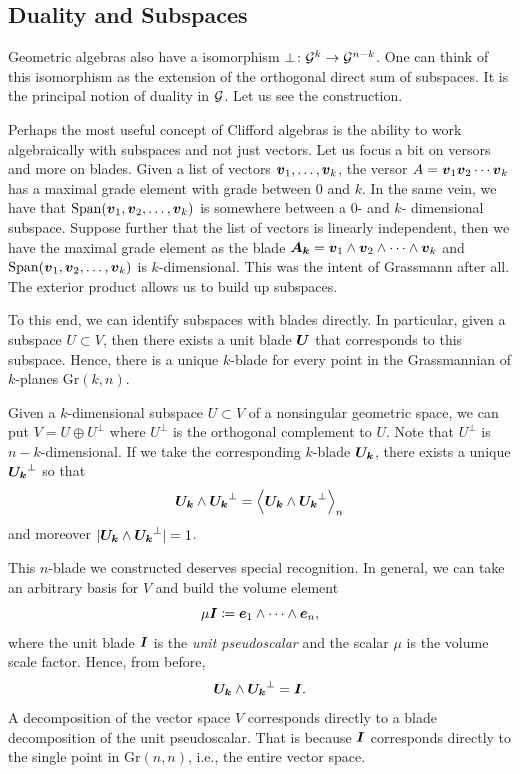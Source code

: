 \documentclass{article}
\begin{document}
\subsection{Duality and Subspaces}

Geometric algebras also have a isomorphism $\perp \colon \G^k \to \G^{n-k}$. One can think of this isomorphism as the extension of the orthogonal direct sum of subspaces. It is the principal notion of duality in $\G$. Let us see the construction.

Perhaps the most useful concept of Clifford algebras is the ability to work algebraically with subspaces and not just vectors. Let us focus a bit on versors and more on blades. Given a list of vectors $\blade{v}_1,\dots,\blade{v}_k$, the versor $A=\blade{v}_1\blade{v}_2\cdots \blade{v}_k$ has a maximal grade element with grade between 0 and $k$. In the same vein, we have that $\mathrm{Span}(\blade{v}_1,\blade{v}_2,\dots,\blade{v}_k)$ is somewhere between a 0- and $k$- dimensional subspace. Suppose further that the list of vectors is linearly independent, then we have the maximal grade element as the blade $\blade{A_k}=\blade{v}_1\wedge \blade{v}_2\wedge \cdots \wedge \blade{v}_k$ and $\mathrm{Span}(\blade{v}_1,\blade{v}_2,\dots,\blade{v}_k)$ is $k$-dimensional. This was the intent of Grassmann after all. The exterior product allows us to build up subspaces.

To this end, we can identify subspaces with blades directly. In particular, given a subspace $U \subset V$, then there exists a unit blade $\blade{U}$ that corresponds to this subspace. Hence, there is a unique $k$-blade for every point in the Grassmannian of $k$-planes $\mathrm{Gr}(k,n)$.

Given a $k$-dimensional subspace $U\subset V$ of a nonsingular geometric space, we can put $V=U \oplus U^\perp$ where $U^\perp$ is the orthogonal complement to $U$. Note that $U^\perp$ is $n-k$-dimensional. If we take the corresponding $k$-blade $\blade{U_k}$, there exists a unique $\blade{U_k}^\perp$ so that
\begin{equation}
    \blade{U_k}\wedge \blade{U_k}^\perp = \proj{n}{\blade{U_k}\wedge \blade{U_k}^\perp}
\end{equation}
and moreover $|\blade{U_k}\wedge \blade{U_k}^\perp|=1$. 

This $n$-blade we constructed deserves special recognition. In general, we can take an arbitrary basis for $V$ and build the volume element
\begin{equation}
\label{eq:volume_scaling}
    \mu \blade{I} \coloneqq \blade{e}_1 \wedge \cdots \wedge \blade{e}_n,
\end{equation}
where the unit blade $\pseudoscalar$ is the \emph{unit pseudoscalar} and the scalar $\mu$ is the volume scale factor. Hence, from before, 
\begin{equation}
\label{eq:blade_decomposition}
    \blade{U_k}\wedge \blade{U_k}^\perp = \pseudoscalar.
\end{equation}
A decomposition of the vector space $V$ corresponds directly to a blade decomposition of the unit pseudoscalar. That is because $\pseudoscalar$ corresponds directly to the single point in $\mathrm{Gr}(n,n)$, i.e., the entire vector space.
\end{document}
